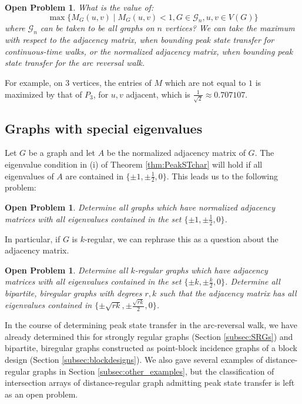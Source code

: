 \documentclass{article}
\newtheorem{openprob}[theorem]{Open Problem}
\numberwithin{equation}{section}
\newcommand\cG{{\mathcal G}}
\begin{document}
 \begin{openprob}
 What is the value of:
 \[
 \max \{ M_G(u,v) \mid M_G(u,v) < 1, G \in \cG_n , u,v \in V(G)\}
 \]
 where $\cG_n$ can be taken to be all graphs on $n$ vertices? We can take the maximum with respect to the adjacency matrix, when bounding peak state transfer for continuous-time walks, or the normalized adjacency matrix, when bounding peak state transfer for the arc reversal walk. 
 \end{openprob}
 
 For example, on $3$ vertices, the entries of $M$ which are not equal to $1$ is maximized by that of $P_3$, for $u,v$ adjacent, which is $\frac{1}{\sqrt{2}} \approx 0.707107$. 

\subsection*{Graphs with special eigenvalues }

Let $G$ be a graph and let $A$ be the normalized adjacency matrix of $G$. The eigenvalue condition in (i) of Theorem \ref{thm:PeakSTchar} will hold if all eigenvalues of $A$ are contained in $\{\pm 1, \pm \frac{1}{2},0\}$. This leads us to the following problem:

\begin{openprob}
Determine all graphs which have normalized adjacency matrices with all eigenvalues contained in the set $\{\pm 1, \pm \frac{1}{2},0\}$. 
\end{openprob}

In particular, if $G$ is $k$-regular, we can rephrase this as a question about the adjacency matrix. 


\begin{openprob}
Determine all $k$-regular graphs which have adjacency matrices with all eigenvalues contained in the set $\{\pm k, \pm \frac{k}{2},0\}$. Determine all bipartite, biregular graphs with degrees $r,k$ such that the adjacency matrix has all eigenvalues contained in $\{\pm \sqrt{rk}, \pm \frac{\sqrt{rk}}{2},0\}$. 
\end{openprob}

In the course of determining peak state transfer in the arc-reversal walk, we have already determined this for  strongly regular graphs (Section \ref{subsec:SRGs}) and  bipartite, biregular graphs constructed as point-block incidence graphs of a block design (Section \ref{subsec:blockdesigns}). We also gave several examples of distance-regular graphs in Section \ref{subsec:other_examples}, but the classification of intersection arrays of distance-regular graph admitting peak state transfer is left as an open problem. 
\end{document}
